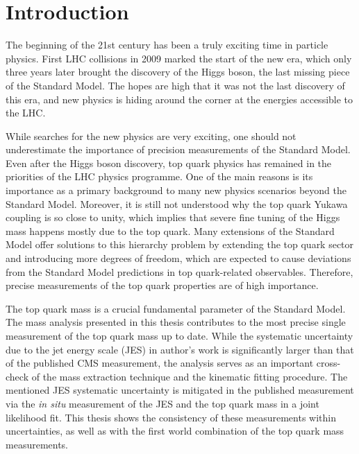 
\chapter{Introduction}
\label{c:intro}
\ifpdf
    \graphicspath{{01_Introduction/plots/}}
\else
    \graphicspath{{01_Introduction/plots/EPS/}{01_Introduction/plots/}}
\fi

The beginning of the 21st century has been a truly exciting time in particle physics. First LHC collisions in 2009
marked the start of the new era, which only three years later brought the discovery of the Higgs boson, the last missing
piece of the Standard Model. The hopes are high that it was not the last discovery of this era, and new physics is
hiding around the corner at the energies accessible to the LHC.

While searches for the new physics are very exciting, one should not underestimate the importance of precision
measurements of the Standard Model. Even after the Higgs boson discovery, top quark physics has remained in the
priorities of the LHC physics programme. One of the main reasons is its importance as a primary background to many new
physics scenarios beyond the Standard Model. Moreover, it is still not understood why the top quark Yukawa coupling is
so close to unity, which implies that severe fine tuning of the Higgs mass happens mostly due to the top quark. Many
extensions of the Standard Model offer solutions to this hierarchy problem by extending the top quark sector and
introducing more degrees of freedom, which are expected to cause deviations from the Standard Model predictions in top
quark-related observables. Therefore, precise measurements of the top quark properties are of high importance.

The top quark mass is a crucial fundamental parameter of the Standard Model. The mass analysis presented in this thesis
contributes to the most precise single measurement of the top quark mass up to date. While the systematic uncertainty
due to the jet energy scale (JES) in author's work is significantly larger than that of the published CMS measurement,
the analysis serves as an important cross-check of the mass extraction technique and the kinematic fitting procedure.
The mentioned JES systematic uncertainty is mitigated in the published measurement via the \textit{in situ} measurement
of the JES and the top quark mass in a joint likelihood fit. This thesis shows the consistency of these measurements
within uncertainties, as well as with the first world combination of the top quark mass measurements.

